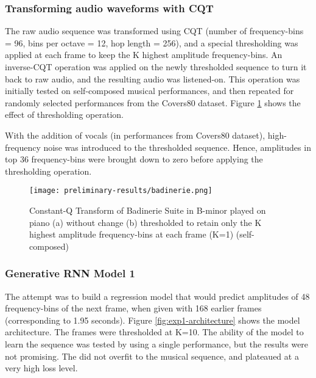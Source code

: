 \documentclass[../main.tex]{subfiles}
\begin{document}
\subsubsection{Transforming audio waveforms with CQT}

\par
The raw audio sequence was transformed using \gls{CQT} (number of frequency-bins = 96, bins per octave = 12, hop length = 256), and a special thresholding was applied at each frame to keep the K highest amplitude frequency-bins. An inverse-\gls{CQT} operation was applied on the newly thresholded sequence to turn it back to raw audio, and the resulting audio was listened-on. This operation was initially tested on self-composed musical performances, and then repeated for randomly selected performances from the Covers80 dataset. Figure \ref{fig:badinerie} shows the effect of thresholding operation.

\par
With the addition of vocals (in performances from Covers80 dataset), high-frequency noise was introduced to the thresholded sequence. Hence, amplitudes in top 36 frequency-bins were brought down to zero before applying the thresholding operation.

\begin{figure}[H]
    \centering
    \texttt{[image: preliminary-results/badinerie.png]}
    \caption{Constant-Q Transform of Badinerie Suite in B-minor played on piano (a) without change (b) thresholded to retain only the K highest amplitude frequency-bins at each frame (K=1) (self-composed) }
    \label{fig:badinerie}
\end{figure}

\iffalse
\begin{figure}[H]
    \centering
    \texttt{[image: preliminary-results/c-major-scale.png]}
    \caption{Constant-Q Transform of ascending and descending the C-major scale, thresholded to retain only the highest K amplitude frequency-bins at each frame (K=1 here) }
    \label{fig:c-major-scale}
\end{figure}
\fi



\subsubsection{Generative RNN Model 1}

\par
The attempt was to build a regression model that would predict amplitudes of 48 frequency-bins of the next frame, when given with 168 earlier frames (corresponding to 1.95 seconds). Figure \ref{fig:exp1-architecture} shows the model architecture. The frames were thresholded at K=10. The ability of the model to learn the sequence was tested by using a single performance, but the results were not promising. The did not overfit to the musical sequence, and plateaued at a very high loss level.
\end{document}
